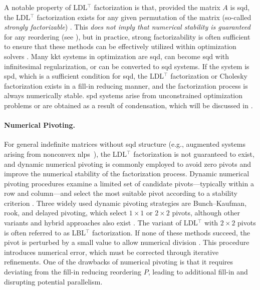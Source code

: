 \documentclass{article}
\begin{document}
A notable property of LDL$^\top$ factorization is that, provided the matrix $A$ is \gls*{sqd}, the LDL$^\top$ factorization exists for any given permutation of the matrix (so-called \emph{strongly factorizable}) \cite{vanderbeiSymmetricQuasidefiniteMatrices1995}. This \emph{does not imply that numerical stability is guaranteed} for any reordering (see \cite{vanderbeiSymmetricQuasidefiniteMatrices1995}), but in practice, strong factorizability is often sufficient to ensure that these methods can be effectively utilized within optimization solvers \cite{stellatoOSQPOperatorSplitting2020}. Many \gls*{kkt} systems in optimization are \gls*{sqd}, can become \gls*{sqd} with infinitesimal regularization, or can be converted to \gls*{sqd} systems. If the system is \gls*{spd}, which is a sufficient condition for \gls*{sqd}, the LDL$^\top$ factorization or Cholesky factorization exists in a fill-in reducing manner, and the factorization process is always numerically stable. \gls*{spd} systems arise from unconstrained optimization problems or are obtained as a result of condensation, which will be discussed in .

\paragraph{Numerical Pivoting.}

For general indefinite matrices without \gls*{sqd} structure (e.g., augmented systems arising from nonconvex \glspl*{nlp}~\cite{wachterImplementationInteriorpointFilter2006}), the LDL$^\top$ factorization is not guaranteed to exist, and dynamic numerical pivoting is commonly employed to avoid zero pivots and improve the numerical stability of the factorization process. Dynamic numerical pivoting procedures examine a limited set of candidate pivots—typically within a row and column—and select the most suitable pivot according to a stability criterion \cite{schenkFASTFACTORIZATIONPIVOTING}. Three widely used dynamic pivoting strategies are Bunch–Kaufman, rook, and delayed pivoting, which select $1 \times 1$ or $2 \times 2$ pivots, although other variants and hybrid approaches also exist \cite{duffDirectMethodsSparse2017}. The variant of LDL$^\top$ with $2 \times 2$ pivots is often referred to as LBL$^\top$ factorization. If none of these methods succeed, the pivot is perturbed by a small value to allow numerical division \cite{schenkFASTFACTORIZATIONPIVOTING}. This procedure introduces numerical error, which must be corrected through iterative refinements. One of the drawbacks of numerical pivoting is that it requires deviating from the fill-in reducing reordering $P$, leading to additional fill-in and disrupting potential parallelism.
\end{document}
